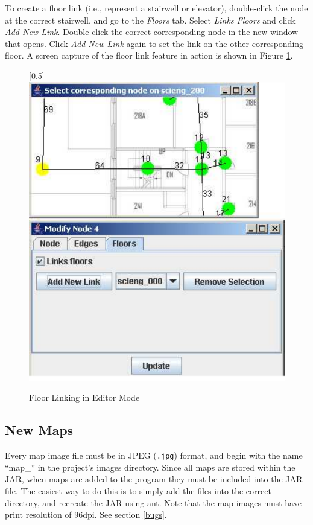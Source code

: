 \documentclass[12pt,letterpaper,titlepage]{article}   %
\begin{document}
To create a floor link (i.e., represent a stairwell or elevator),
double-click the node at the correct stairwell, and go to the \emph{Floors}
tab. Select \emph{Links Floors} and click \emph{Add New Link}. Double-click the
correct corresponding node in the new window that opens. Click \emph{Add New
Link} again to set the link on the other corresponding floor. A screen
capture of the floor link feature in action is shown in
Figure \ref{editor-screenshot-2}.

\begin{figure}
\begin{center}
  \scalebox{0.5}[0.5]{\includegraphics{images/pdf/editor-screenshot-2}}
\end{center}
\caption{Floor Linking in Editor Mode}
\label{editor-screenshot-2}
\end{figure}
 
\subsection{New Maps}
Every map image file must be in JPEG (\texttt{.jpg}) format, and begin with the
name ``map\_'' in the project's images directory. Since all maps are
stored within the JAR, when maps are added to the program they must be
included into the JAR file. The easiest way to do this is to simply add
the files into the correct directory, and recreate the JAR using ant.
Note that the map images must have print resolution of 96dpi. See section
\ref{bugs}.
\end{document}
